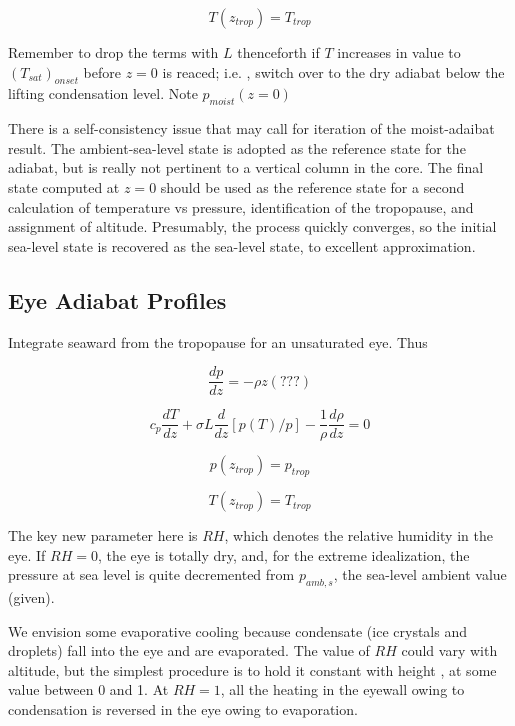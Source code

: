 \documentclass[preprint, prX]{revtex4}
\newcommand{\dd}[2]{\frac{d#1}{d#2}}
\begin{document}
\begin{equation}
	T(z_{trop} ) = T_{trop}
\end{equation}

Remember to drop the terms with $L$ thenceforth if $T$ increases in value to $(T_{sat})_{onset}$ before $z=0$ is reaced; i.e. , switch over to the dry adiabat below the lifting condensation level. Note $p_{moist}(z=0)$

There is a self-consistency issue that may call for iteration of the moist-adaibat result. The ambient-sea-level state is adopted as the reference state for the adiabat, but is really not pertinent to a vertical column in the core. The final state computed at $z=0$ should be used as the reference state for a second calculation of temperature vs pressure, identification of the tropopause, and assignment of altitude. Presumably, the process quickly converges, so the initial sea-level state is recovered as the sea-level state, to excellent approximation.

\subsection{Eye Adiabat Profiles}

Integrate seaward from the tropopause for an unsaturated eye. Thus

\begin{equation}
	\dd{p}{z} = - \rho z (???)
\end{equation}

\begin{equation}
	c_p \dd{T}{z} + \sigma L \dd{}{z} [ p(T) / p] - \frac{1}{\rho} \dd{\rho}{z} = 0
\end{equation}

\begin{equation}
	p(z_{trop}) = p_{trop} 
\end{equation}

\begin{equation}
	T(z_{trop} ) = T_{trop}
\end{equation}

The key new parameter here is $RH$, which denotes the relative humidity in the eye. If $RH=0$, the eye is totally dry, and, for the extreme idealization, the pressure at sea level is quite decremented from $p_{amb,s}$, the sea-level ambient value (given).

We envision some evaporative cooling because condensate (ice crystals and droplets) fall into the eye and are evaporated. The value of $RH$ could vary with altitude, but the simplest procedure is to hold it constant with height , at some value between 0 and 1. At $RH=1$, all the heating in the eyewall owing to condensation is reversed in the eye owing to evaporation.
\end{document}
